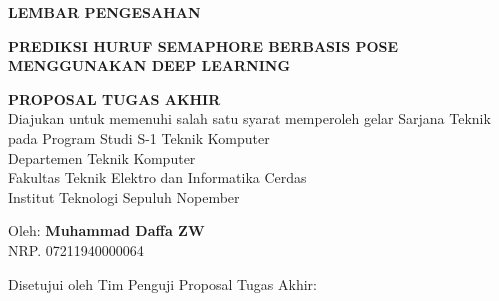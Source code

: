 \begin{center}
	\large
  \textbf{LEMBAR PENGESAHAN}
\end{center}

\thispagestyle{empty}

\begin{center}
  \textbf{PREDIKSI HURUF SEMAPHORE BERBASIS POSE MENGGUNAKAN DEEP LEARNING}
\end{center}

\begingroup
  \small

  \begin{center}
    \textbf{PROPOSAL TUGAS AKHIR} \\
    Diajukan untuk memenuhi salah satu syarat memperoleh gelar
    Sarjana Teknik pada 
    Program Studi S-1 Teknik Komputer\\
    Departemen Teknik Komputer \\
    Fakultas Teknik Elektro dan Informatika Cerdas \\
    Institut Teknologi Sepuluh Nopember
  \end{center}

  \begin{center}
    Oleh: \textbf{Muhammad Daffa ZW} \\
    NRP. 07211940000064
  \end{center}

  \begin{center}
    Disetujui oleh Tim Penguji Proposal Tugas Akhir:
  \end{center}

  \begingroup
    \setlength{\tabcolsep}{0pt}

